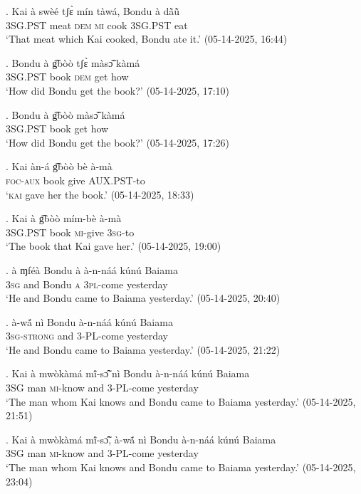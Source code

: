 \documentclass{assets/fieldnotes}
\begin{document}
\exg. Kai à swèé tʃɛ̀ mín tàwá, Bondu à dã̀ũ̀\\
{} \textsc{3SG.PST} meat \textsc{dem} \textsc{mi} cook {} \textsc{3SG.PST} eat \\
`That meat which Kai cooked, Bondu ate it.’ \hfill{(05-14-2025, 16:44)}

\exg. Bondu à g͡bòò tʃɛ̀ màsɔ̃̌ kàmá\\
{} \textsc{3SG.PST} book \textsc{dem} get how\\
`How did Bondu get the book?’ \hfill{(05-14-2025, 17:10)}

\exg. Bondu à g͡bòò màsɔ̃̌ kàmá\\
{} \textsc{3SG.PST} book get how\\
`How did Bondu get the book?’ \hfill{(05-14-2025, 17:26)}

\exg. Kai àn-á g͡bòò bè à-mà\\
{} \textsc{foc}-\textsc{aux} book give \textsc{AUX.PST}-to\\
`\textsc{kai} gave her the book.’ \hfill{(05-14-2025, 18:33)}

\exg. Kai à g͡bòò mím-bè à-mà\\
{} \textsc{3SG.PST} book \textsc{mi}-give \textsc{3sg}-to\\
`The book that Kai gave her.’ \hfill{(05-14-2025, 19:00)}

\exg. à ɱféà Bondu à à-n-náá kúnú Baiama\\
\textsc{3sg} and {Bondu} \textsc{a} \textsc{3pl}-come yesterday {}\\
`He and Bondu came to Baiama yesterday.’ \hfill{(05-14-2025, 20:40)}

\exg. à-wã́ nì Bondu à-n-náá kúnú Baiama\\
\textsc{3sg-strong} and {} \textsc{3-PL}-come yesterday {}\\
`He and Bondu came to Baiama yesterday.’ \hfill{(05-14-2025, 21:22)}

\exg. Kai à mwòkàmá mĩ́-sɔ̃̂ nì Bondu à-n-náá kúnú Baiama\\
{} \textsc{3SG} man \textsc{mi}-know and {} \textsc{3-PL}-come yesterday {}\\
`The man whom Kai knows and Bondu came to Baiama yesterday.’ \hfill{(05-14-2025, 21:51)}

\exg. Kai à mwòkàmá mĩ́-sɔ̃̂, à-wã́ nì Bondu à-n-náá kúnú Baiama\\
{} \textsc{3SG} man \textsc{mi}-know and {} \textsc{3-PL}-come yesterday {}\\
`The man whom Kai knows and Bondu came to Baiama yesterday.’ \hfill{(05-14-2025, 23:04)}
\end{document}
